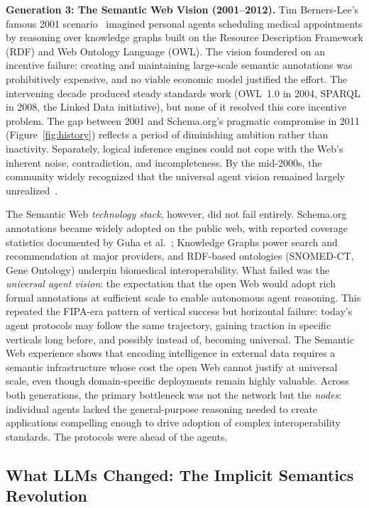 \documentclass{IEEEcsmag}
\begin{document}
\textbf{Generation 3: The Semantic Web Vision (2001--2012).}  Tim Berners-Lee's famous 2001 scenario~\cite{Berners-Lee_2001} imagined personal agents scheduling medical appointments by reasoning over knowledge graphs built on the Resource Description Framework (RDF) and Web Ontology Language (OWL). The vision foundered on an incentive failure: creating and maintaining large-scale semantic annotations was prohibitively expensive, and no viable economic model justified the effort. The intervening decade produced steady standards work (OWL~1.0 in 2004, SPARQL in 2008, the Linked Data initiative), but none of it resolved this core incentive problem. The gap between 2001 and Schema.org's pragmatic compromise in 2011 (Figure~\ref{fig:history}) reflects a period of diminishing ambition rather than inactivity. Separately, logical inference engines could not cope with the Web's inherent noise, contradiction, and incompleteness. By the mid-2000s, the community widely recognized that the universal agent vision remained largely unrealized~\cite{Hogan_2020}.

The Semantic Web \emph{technology stack}, however, did not fail entirely. Schema.org annotations became widely adopted on the public web, with reported coverage statistics documented by Guha et al.~\cite{Guha_2016}; Knowledge Graphs power search and recommendation at major providers, and RDF-based ontologies (SNOMED-CT, Gene Ontology) underpin biomedical interoperability. What failed was the \emph{universal agent vision}: the expectation that the open Web would adopt rich formal annotations at sufficient scale to enable autonomous agent reasoning. This repeated the FIPA-era pattern of vertical success but horizontal failure: today's agent protocols may follow the same trajectory, gaining traction in specific verticals long before, and possibly instead of, becoming universal. The Semantic Web experience shows that encoding intelligence in external data requires a semantic infrastructure whose cost the open Web cannot justify at universal scale, even though domain-specific deployments remain highly valuable.  Across both generations, the primary bottleneck was not the network but the \emph{nodes}: individual agents lacked the general-purpose reasoning needed to create applications compelling enough to drive adoption of complex interoperability standards. The protocols were ahead of the agents.

\subsection{What LLMs Changed: The Implicit Semantics Revolution}
\end{document}
